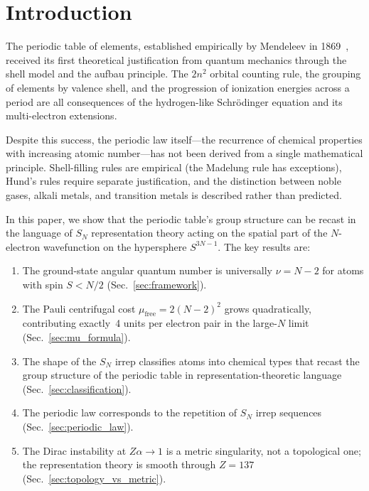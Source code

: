 \documentclass[aps,prl,twocolumn,superscriptaddress,longbibliography]{revtex4-2}
\newcommand{\mufree}{\mu_{\mathrm{free}}}
\begin{document}
\section{Introduction}
\label{sec:intro}

The periodic table of elements, established empirically by Mendeleev
in 1869~\cite{Mendeleev1869}, received its first theoretical
justification from quantum mechanics through the shell model and the
aufbau principle.  The $2n^2$ orbital counting rule, the grouping of
elements by valence shell, and the progression of ionization energies
across a period are all consequences of the hydrogen-like
Schr\"odinger equation and its multi-electron extensions.

Despite this success, the periodic law itself---the recurrence of
chemical properties with increasing atomic number---has not been
derived from a single mathematical principle.  Shell-filling rules are
empirical (the Madelung rule has exceptions), Hund's rules require
separate justification, and the distinction between noble gases, alkali
metals, and transition metals is described rather than predicted.

In this paper, we show that the periodic table's group structure
can be recast in the language of $S_N$ representation theory acting
on the spatial part of the $N$-electron wavefunction on the
hypersphere $S^{3N-1}$.  The key results are:

\begin{enumerate}
  \item The ground-state angular quantum number is universally $\nu =
    N - 2$ for atoms with spin $S < N/2$ (Sec.~\ref{sec:framework}).
  \item The Pauli centrifugal cost $\mufree = 2(N-2)^2$ grows
    quadratically, contributing exactly~4 units per electron pair in
    the large-$N$ limit (Sec.~\ref{sec:mu_formula}).
  \item The shape of the $S_N$ irrep classifies atoms into chemical
    types that recast the group structure of the periodic table in
    representation-theoretic language
    (Sec.~\ref{sec:classification}).
  \item The periodic law corresponds to the repetition of $S_N$ irrep
    sequences (Sec.~\ref{sec:periodic_law}).
  \item The Dirac instability at $Z\alpha \to 1$ is a metric
    singularity, not a topological one; the representation theory
    is smooth through $Z = 137$
    (Sec.~\ref{sec:topology_vs_metric}).
\end{enumerate}
\end{document}
